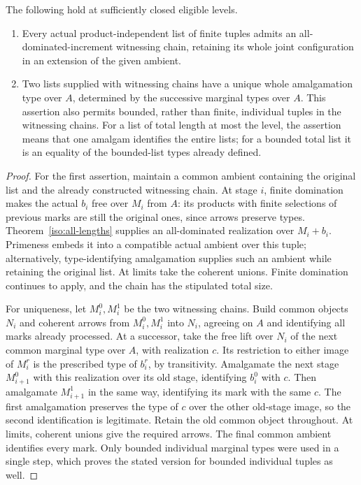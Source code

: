 \begin{lemma}\label{iso:witnessed-uniqueness}
The following hold at sufficiently closed eligible levels.
\begin{enumerate}
\item Every actual product-independent list of finite tuples admits
an all-dominated-increment witnessing chain, retaining its whole
joint configuration in an extension of the given ambient.
\item Two lists supplied with witnessing chains have a unique whole
amalgamation type over $A$, determined by the successive marginal
types over $A$. This assertion also permits bounded, rather than
finite, individual tuples in the witnessing chains. For a list of
total length at most the level, the assertion means that one
amalgam identifies the entire lists; for a bounded total list it is
an equality of the bounded-list types already defined.
\end{enumerate}
\end{lemma}

\begin{proof}
For the first assertion, maintain a common ambient containing the
original list and the already constructed witnessing chain. At stage
$i$, finite domination makes the actual $b_i$ free over $M_i$ from
$A$: its products with finite selections of previous marks are still
the original ones, since arrows preserve types. Theorem~\ref{iso:all-lengths}
supplies an all-dominated realization over $M_i+b_i$. Primeness embeds
it into a compatible actual ambient over this tuple; alternatively,
type-identifying amalgamation supplies such an ambient while retaining
the original list. At limits take the coherent unions. Finite
domination continues to apply, and the chain has the stipulated
total size.

For uniqueness, let $M_i^0,M_i^1$ be the two witnessing chains. Build
common objects $N_i$ and coherent arrows from $M_i^0,M_i^1$ into
$N_i$, agreeing on $A$ and identifying all marks already processed.
At a successor, take the free lift over $N_i$ of the next common
marginal type over $A$, with realization $c$. Its restriction to
either image of $M_i^r$ is the prescribed type of $b_i^r$, by
transitivity. Amalgamate the next stage $M_{i+1}^0$ with this
realization over its old stage, identifying $b_i^0$ with $c$. Then
amalgamate $M_{i+1}^1$ in the same way, identifying its mark with the
same $c$. The first amalgamation preserves the type of $c$ over the
other old-stage image, so the second identification is legitimate.
Retain the old common object throughout. At limits, coherent unions
give the required arrows. The final common ambient identifies every
mark. Only bounded individual marginal types were used in a single
step, which proves the stated version for bounded individual tuples
as well.
\end{proof}

